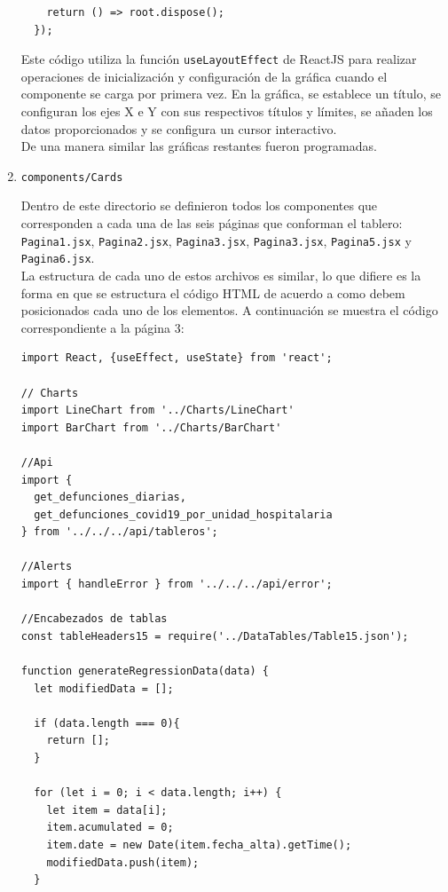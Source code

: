 \begin{enumerate}
\begin{verbatim}
    return () => root.dispose();
  });
\end{verbatim}

Este código utiliza la función \texttt{useLayoutEffect} de ReactJS para realizar operaciones de inicialización y configuración de la gráfica cuando el componente se carga por primera vez.
En la gráfica, se establece un título, se configuran los ejes X e Y con sus respectivos títulos y límites, se añaden los datos proporcionados y se configura un cursor interactivo.\\
De una manera similar las gráficas restantes fueron programadas.


\item \texttt{components/Cards}

Dentro de este directorio se definieron todos los componentes que corresponden a cada una de las seis páginas que conforman el tablero: \texttt{Pagina1.jsx}, \texttt{Pagina2.jsx}, \texttt{Pagina3.jsx}, \texttt{Pagina3.jsx}, \texttt{Pagina5.jsx} y \texttt{Pagina6.jsx}.
\\

La estructura de cada uno de estos archivos es similar, lo que difiere es la forma en que se estructura el código HTML de acuerdo a como debem posicionados cada uno de los elementos. A continuación se muestra el código correspondiente a la página 3:
\\

\begin{verbatim}
import React, {useEffect, useState} from 'react';

// Charts
import LineChart from '../Charts/LineChart'
import BarChart from '../Charts/BarChart'

//Api
import {
  get_defunciones_diarias,
  get_defunciones_covid19_por_unidad_hospitalaria
} from '../../../api/tableros';

//Alerts
import { handleError } from '../../../api/error';

//Encabezados de tablas
const tableHeaders15 = require('../DataTables/Table15.json');

function generateRegressionData(data) {
  let modifiedData = [];

  if (data.length === 0){
    return [];
  }

  for (let i = 0; i < data.length; i++) {
    let item = data[i];
    item.acumulated = 0;
    item.date = new Date(item.fecha_alta).getTime();
    modifiedData.push(item);
  }


\end{verbatim}
\end{enumerate}
